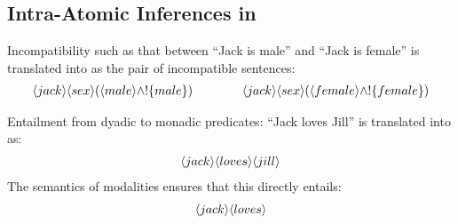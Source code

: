 \subsection{Intra-Atomic Inferences in \ELFULL{}}

Incompatibility such as that between ``Jack is male'' and ``Jack is
female'' is translated into \ELABR{} as the pair of incompatible
sentences:
\begin{eqnarray*}
\langle jack \rangle \langle sex \rangle (\langle male \rangle \land ! \{male\}) 
   \qquad\qquad
\langle jack \rangle \langle sex \rangle (\langle female \rangle \land ! \{female\})
\end{eqnarray*}

\NI Entailment from dyadic to monadic predicates:
``Jack loves Jill'' is translated into \ELABR{} as:
\begin{eqnarray*}
   \langle jack \rangle \langle loves \rangle \langle jill \rangle \end{eqnarray*}
The semantics of modalities ensures that this directly entails:
\begin{eqnarray*}
   \langle jack \rangle \langle loves \rangle \end{eqnarray*}

